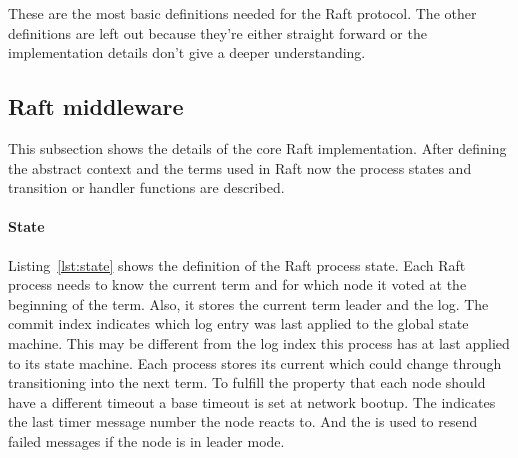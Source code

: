 

These are the most basic definitions needed for the Raft protocol. The other
definitions are left out because they're either straight forward or the
implementation details don't give a deeper understanding.

\subsection{Raft middleware}
This subsection shows the details of the core Raft implementation.
After defining the abstract context and the terms used in Raft
now the process states and transition or handler functions are
described.

\paragraph{State}
Listing~\ref{lst:state} shows the definition of the Raft process
state. Each Raft process needs to know the current term and for
which node it voted at the beginning of the term. Also, it stores
the current term leader and the log. The commit index indicates which
log entry was last applied to the global state machine. This
may be different from the log index this process has at last applied
to its state machine. Each process stores its current 
which could change through transitioning into the next term.
To fulfill the property that each node should have a different
timeout a base timeout is set at network bootup.
The  indicates the last timer message number the node
reacts to. And the  is used to resend
failed messages if the node is in leader mode.

